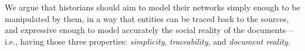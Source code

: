 

We argue that historians should aim to model their networks simply enough to be manipulated by them, in a way that entities can be traced back to the sources, and expressive enough to model accurately the social reality of the documents---i.e., having those three properties:  \textit{simplicity}, \textit{traceability}, and \textit{document reality}.


